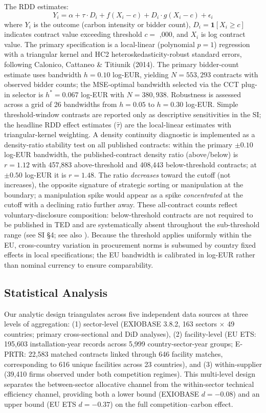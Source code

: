 \documentclass[11pt,a4paper]{article}
\begin{document}
The RDD estimates:
\begin{equation}
Y_i = \alpha + \tau \cdot D_i + f(X_i - c) + D_i \cdot g(X_i - c) + \epsilon_i
\end{equation}
where $Y_i$ is the outcome (carbon intensity or bidder count), $D_i = \mathbf{1}[X_i \geq c]$ indicates contract value exceeding threshold $c = $ ,000, and $X_i$ is log contract value. The primary specification is a local-linear (polynomial $p = 1$) regression with a triangular kernel and HC2 heteroskedasticity-robust standard errors, following Calonico, Cattaneo \& Titiunik (2014)\cite{calonico2020optimal}. The primary bidder-count estimate uses bandwidth $h = 0.10$ log-EUR, yielding $N = 553{,}293$ contracts with observed bidder counts; the MSE-optimal bandwidth selected via the CCT plug-in selector is $h^* = 0.067$ log-EUR with $N = 380{,}938$. Robustness is assessed across a grid of 26 bandwidths from $h = 0.05$ to $h = 0.30$ log-EUR. Simple threshold-window contrasts are reported only as descriptive sensitivities in the SI; the headline RDD effect estimates ($\hat{\tau}$) are the local-linear estimates with triangular-kernel weighting. A density continuity diagnostic is implemented as a density-ratio stability test on all published contracts: within the primary $\pm 0.10$ log-EUR bandwidth, the published-contract density ratio (above/below) is $r = 1.12$ with 457,883 above-threshold and 408,443 below-threshold contracts; at $\pm 0.50$ log-EUR it is $r = 1.48$. The ratio \emph{decreases} toward the cutoff (not increases), the opposite signature of strategic sorting or manipulation at the boundary; a manipulation spike would appear as a spike \emph{concentrated} at the cutoff with a declining ratio further away. These all-contract counts reflect voluntary-disclosure composition: below-threshold contracts are not required to be published in TED and are systematically absent throughout the sub-threshold range (see SI \S4; see also \cite{coviello2018procurement}). Because the threshold applies uniformly within the EU, cross-country variation in procurement norms is subsumed by country fixed effects in local specifications; the EU bandwidth is calibrated in log-EUR rather than nominal currency to ensure comparability.

\subsection{Statistical Analysis}

Our analytic design triangulates across five independent data sources at three levels of aggregation: (1) sector-level (EXIOBASE 3.8.2, 163 sectors $\times$ 49 countries; primary cross-sectional and DiD analyses), (2) facility-level (EU ETS: 195,603 installation-year records across 5,999 country-sector-year groups; E-PRTR: 22,583 matched contracts linked through 646 facility matches, corresponding to 616 unique facilities across 23 countries), and (3) within-supplier (39,410 firms observed under both competition regimes). This multi-level design separates the between-sector allocative channel from the within-sector technical efficiency channel, providing both a lower bound (EXIOBASE $d = -0.08$) and an upper bound (EU ETS $d = -0.37$) on the full competition--carbon effect.
\end{document}
